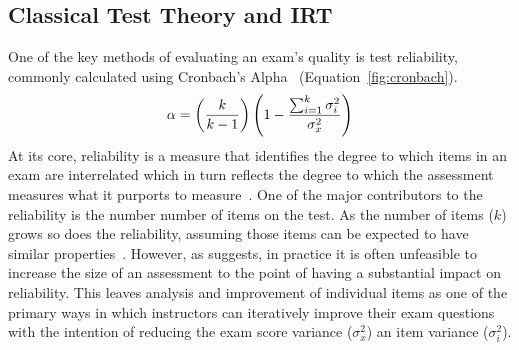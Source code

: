 \documentclass[authorversion,nonacm]{acmart}
\begin{document}
\subsection{Classical Test Theory and IRT}

One of the key methods of evaluating an exam's quality is test reliability,
commonly calculated using Cronbach's Alpha~\cite{cronbach1951coefficient}
(Equation~\ref{fig:cronbach}). 
\begin{equation}
    \alpha =\left({k \over k-1}\right)\left(1-{\sum _{i=1}^{k}\sigma
    _{i}^{2} \over \sigma _{x}^{2}}\right)
\end{equation}\label{fig:cronbach}
At its core, reliability is a measure that identifies the degree to which
items in an exam are interrelated which in turn reflects the degree to which the
assessment measures what it purports to measure~\cite{lord2008statistical,
ebel1967relation, ebel1972essentials}.  
One of the major contributors to the reliability is the number number of items on
the test. As the number of items ($k$) grows so does the reliability, assuming those items can be expected to have
similar properties~\cite{ebel1967relation, allen2001introduction, ebel1972essentials}.
However, as \citet{ebel1967relation} suggests, in practice it is often
unfeasible to increase the size of an assessment to the point of having a
substantial impact on reliability. This leaves 
analysis and improvement of individual items as one of the primary ways in
which instructors can iteratively improve their exam questions with the
intention of reducing the exam score variance ($\sigma^2_x$) an item variance 
($\sigma^2_i$).
\end{document}
